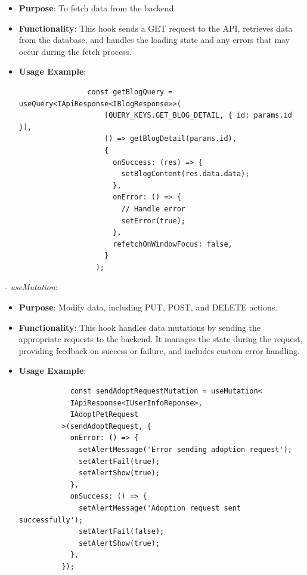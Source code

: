 \begin{itemize}
    \item \textbf{Purpose}: To fetch data from the backend.
    \item \textbf{Functionality}: This hook sends a GET request to the API, retrieves data from the database, and handles the loading state and any errors that may occur during the fetch process.
    \item \textbf{Usage Example}:
          \begin{lstlisting}
                const getBlogQuery = useQuery<IApiResponse<IBlogResponse>>(
                    [QUERY_KEYS.GET_BLOG_DETAIL, { id: params.id }],
                    () => getBlogDetail(params.id),
                    {
                      onSuccess: (res) => {
                        setBlogContent(res.data.data);
                      },
                      onError: () => {
                        // Handle error
                        setError(true);
                      },
                      refetchOnWindowFocus: false,
                    }
                  );
            \end{lstlisting}
\end{itemize}

- \textit{useMutation}:

\begin{itemize}
    \item \textbf{Purpose}: Modify data, including PUT, POST, and DELETE actions.
    \item \textbf{Functionality}: This hook handles data mutations by sending the appropriate requests to the backend. It manages the state during the request, providing feedback on success or failure, and includes custom error handling.
    \item \textbf{Usage Example}:
          \begin{lstlisting}
            const sendAdoptRequestMutation = useMutation<
            IApiResponse<IUserInfoReponse>,
            IAdoptPetRequest
          >(sendAdoptRequest, {
            onError: () => {
              setAlertMessage('Error sending adoption request');
              setAlertFail(true);
              setAlertShow(true);
            },
            onSuccess: () => {
              setAlertMessage('Adoption request sent successfully');
              setAlertFail(false);
              setAlertShow(true);
            },
          });
            \end{lstlisting}
\end{itemize}

